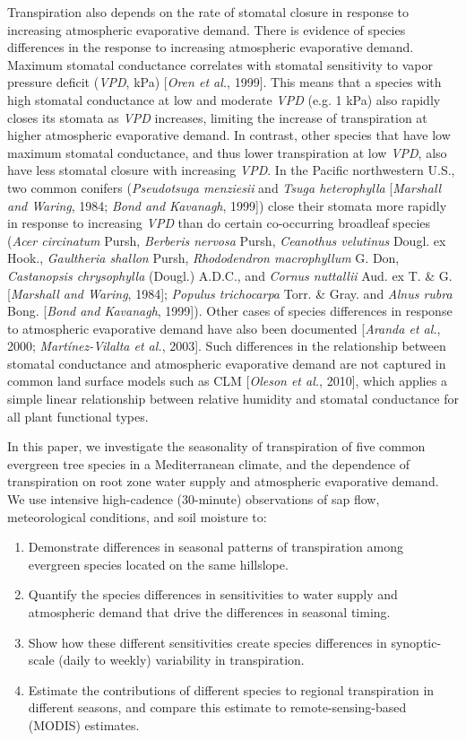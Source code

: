 Transpiration also depends on the rate of stomatal closure in response to increasing atmospheric evaporative demand.  There is evidence of species differences in the response to increasing atmospheric evaporative demand.  Maximum stomatal conductance correlates with stomatal sensitivity to vapor pressure deficit (\textit{VPD}, kPa) [\textit{Oren et al.}, 1999].  This means that a species with high stomatal conductance at low and moderate \textit{VPD} (e.g. 1 kPa) also rapidly closes its stomata as \textit{VPD} increases, limiting the increase of transpiration at higher atmospheric evaporative demand.  In contrast, other species that have low maximum stomatal conductance, and thus lower transpiration at low \textit{VPD}, also have less stomatal closure with increasing \textit{VPD}.  In the Pacific northwestern U.S., two common conifers (\textit{Pseudotsuga menziesii} and \textit{Tsuga heterophylla} [\textit{Marshall and Waring}, 1984; \textit{Bond and Kavanagh}, 1999]) close their stomata more rapidly in response to increasing \textit{VPD} than do certain co-occurring broadleaf species (\textit{Acer circinatum} Pursh, \textit{Berberis nervosa} Pursh, \textit{Ceanothus velutinus} Dougl. ex Hook., \textit{Gaultheria shallon} Pursh, \textit{Rhododendron macrophyllum} G. Don, \textit{Castanopsis chrysophylla} (Dougl.) A.D.C., and \textit{Cornus nuttallii} Aud. ex T. \& G. [\textit{Marshall and Waring}, 1984]; \textit{Populus trichocarpa} Torr. \& Gray. and \textit{Alnus rubra} Bong. [\textit{Bond and Kavanagh}, 1999]).  Other cases of species differences in response to atmospheric evaporative demand have also been documented [\textit{Aranda et al.}, 2000; \textit{Mart\'inez-Vilalta et al.}, 2003].  Such differences in the relationship between stomatal conductance and atmospheric evaporative demand are not captured in common land surface models such as CLM [\textit{Oleson et al.}, 2010], which applies a simple linear relationship between relative humidity and stomatal conductance for all plant functional types.

In this paper, we investigate the seasonality of transpiration of five common evergreen tree species in a Mediterranean climate, and the dependence of transpiration on root zone water supply and atmospheric evaporative demand. We use intensive high-cadence (30-minute) observations of sap flow, meteorological conditions, and soil moisture to:
\begin{enumerate}
\item Demonstrate differences in seasonal patterns of transpiration among evergreen species located on the same hillslope.
\item Quantify the species differences in sensitivities to water supply and atmospheric demand that drive the differences in seasonal timing.
\item Show how these different sensitivities create species differences in synoptic-scale (daily to weekly) variability in transpiration.
\item Estimate the contributions of different species to regional transpiration in different seasons, and compare this estimate to remote-sensing-based (MODIS) estimates.
\end{enumerate}

